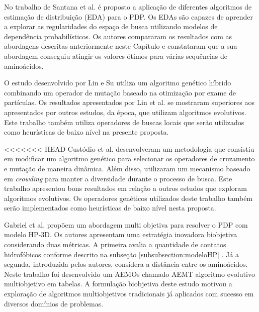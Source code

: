 No trabalho de Santana et al. \cite{santana2008protein} é proposto a aplicação de diferentes algoritmos de estimação de distribuição (EDA) para o PDP. Os EDAs são capazes de aprender a explorar as regularidades do espaço de busca utilizando modelos de dependência probabilísticos. Os autores compararam os resultados com as abordagens descritas anteriormente neste Capítulo e constataram que a sua abordagem conseguiu atingir os valores ótimos para várias sequências de aminoácidos.

O estudo \cite{lin2011protein} desenvolvido por Lin e Su utiliza um algoritmo genético híbrido combinando um operador de mutação baseado na otimização por exame de partículas. Os resultados apresentados por Lin et al. se mostraram superiores aos apresentados por outros estudos, da época, que utilizam algoritmos evolutivos. Este trabalho também utiliza operadores de buscas locais que serão utilizados como heurísticas de baixo nível na presente proposta. 


<<<<<<< HEAD
Custódio et al. \cite{custodio2014multiple} desenvolveram um metodologia que consistiu em modificar um algoritmo genético para selecionar os operadores de cruzamento e mutação de maneira dinâmica. Além disso, utilizaram um mecanismo baseado em \textit{crowding}  para manter a diversidade durante o processo de busca. Este trabalho apresentou bons resultados em relação a outros estudos que exploram algoritmos evolutivos. Os operadores genéticos utilizados deste trabalho também serão implementados como heurísticas de baixo nível nesta proposta.

Gabriel et al. propõem um abordagem multi objetiva \cite{gabriel2012algoritmos} para resolver o PDP com modelo HP-3D. Os autores apresentam uma estratégia inovadora biobjetiva considerando duas métricas. A primeira avalia a quantidade de contatos hidrofóbicos conforme descrito na subseção \ref{subsubsection:modeloHP}  . Já a segunda, introduzida pelos autores, considera a distância entre os aminoácidos. Neste trabalho foi desenvolvido um AEMOs chamado AEMT \cite{gabriel2012algoritmos} algoritmo evolutivo multiobjetivo em tabelas. A formulação biobjetiva deste estudo motivou a exploração de algoritmos multiobjetivos tradicionais já aplicados com sucesso em diversos domínios de problemas.  


